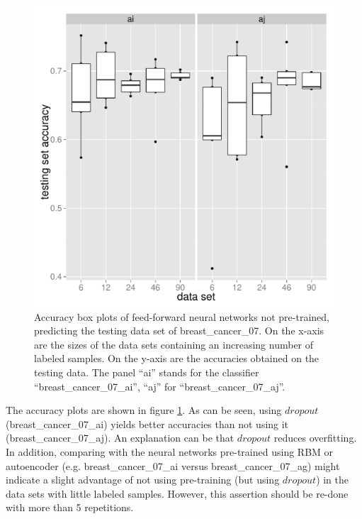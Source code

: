 \begin{figure}
\begin{centering}
\includegraphics[width=0.68\paperwidth]{images/breast_cancer_07-accuracies-ai_aj.pdf}
\par\end{centering}
\caption[Accuracy box plots of feed-forward neural networks not pre-trained,
predicting the testing data set of breast\_cancer\_07.]{\label{fig:Accuracy-box-plots-of-breast_cancer_07_ai-aj}Accuracy
box plots of feed-forward neural networks not pre-trained, predicting
the testing data set of breast\_cancer\_07. On the x-axis are the
sizes of the data sets containing an increasing number of labeled
samples. On the y-axis are the accuracies obtained on the testing
data. The panel ``ai'' stands for the classifier ``breast\_cancer\_07\_ai'',
``aj'' for ``breast\_cancer\_07\_aj''.}
\end{figure}

The accuracy plots are shown in figure \ref{fig:Accuracy-box-plots-of-breast_cancer_07_ai-aj}.
As can be seen, using $dropout$ (breast\_cancer\_07\_ai) yields better
accuracies than not using it (breast\_cancer\_07\_aj). An explanation
can be that \emph{$dropout$} reduces overfitting. In addition, comparing
with the neural networks pre-trained using RBM or autoencoder (e.g.
breast\_cancer\_07\_ai versus breast\_cancer\_07\_ag) might indicate
a slight advantage of not using pre-training (but using $dropout$)
in the data sets with little labeled samples. However, this assertion
should be re-done with more than 5 repetitions.

